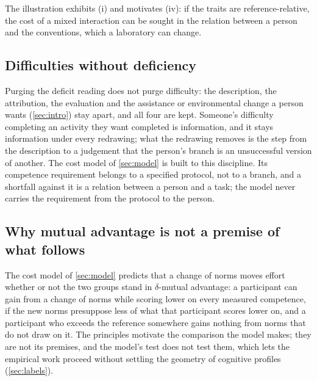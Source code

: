 The illustration exhibits (i) and motivates (iv): if the traits are reference-relative, the cost of a mixed interaction can be sought in the relation between a person and the conventions, which a laboratory can change.


\subsection{Difficulties without deficiency}
\label{sec:difficulties}

Purging the deficit reading does not purge difficulty: the description, the attribution, the evaluation and the assistance or environmental change a person wants (\autoref{sec:intro}) stay apart, and all four are kept. Someone's difficulty completing an activity they want completed is information, and it stays information under every redrawing; what the redrawing removes is the step from the description to a judgement that the person's branch is an unsuccessful version of another. The cost model of \autoref{sec:model} is built to this discipline. Its competence requirement belongs to a specified protocol, not to a branch, and a shortfall against it is a relation between a person and a task; the model never carries the requirement from the protocol to the person.

\subsection{Why mutual advantage is not a premise of what follows}
\label{sec:not-premise}

The cost model of \autoref{sec:model} predicts that a change of norms moves effort whether or not the two groups stand in $\delta$-mutual advantage: a participant can gain from a change of norms while scoring lower on every measured competence, if the new norms presuppose less of what that participant scores lower on, and a participant who exceeds the reference somewhere gains nothing from norms that do not draw on it. The principles motivate the comparison the model makes; they are not its premises, and the model's test does not test them, which lets the empirical work proceed without settling the geometry of cognitive profiles (\autoref{sec:labels}).

